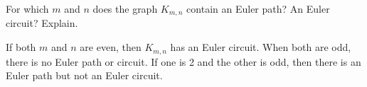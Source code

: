 \begin{questions}
	
	


\question For which $m$ and $n$ does the graph $K_{m,n}$ contain an Euler path?  An Euler circuit?  Explain.

	\begin{answer}
		If both $m$ and $n$ are even, then $K_{m,n}$ has an Euler circuit.  When both are odd, there is no Euler path or circuit.  If one is 2 and the other is odd, then there is an Euler path but not an Euler circuit. %
	\end{answer}


\end{questions}